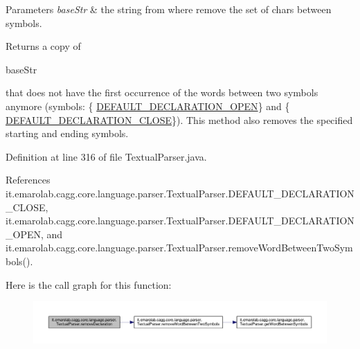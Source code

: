 \begin{DoxyParams}{Parameters}
{\em base\-Str} & the string from where remove the set of chars between symbols. \\
\hline
\end{DoxyParams}
\begin{DoxyReturn}{Returns}
a copy of
\begin{DoxyCode}
baseStr 
\end{DoxyCode}
 that does not have the first occurrence of the words between two symbols anymore (symbols\-: \{ \hyperlink{classit_1_1emarolab_1_1cagg_1_1core_1_1language_1_1parser_1_1TextualParser_aa075e6ceef45f7c212a5a7074e3c3417}{D\-E\-F\-A\-U\-L\-T\-\_\-\-D\-E\-C\-L\-A\-R\-A\-T\-I\-O\-N\-\_\-\-O\-P\-E\-N}\} and \{ \hyperlink{classit_1_1emarolab_1_1cagg_1_1core_1_1language_1_1parser_1_1TextualParser_ad3397a80478c23fe4bcd487e6ffd6c0d}{D\-E\-F\-A\-U\-L\-T\-\_\-\-D\-E\-C\-L\-A\-R\-A\-T\-I\-O\-N\-\_\-\-C\-L\-O\-S\-E}\}). This method also removes the specified starting and ending symbols. 
\end{DoxyReturn}


Definition at line 316 of file Textual\-Parser.\-java.



References it.\-emarolab.\-cagg.\-core.\-language.\-parser.\-Textual\-Parser.\-D\-E\-F\-A\-U\-L\-T\-\_\-\-D\-E\-C\-L\-A\-R\-A\-T\-I\-O\-N\-\_\-\-C\-L\-O\-S\-E, it.\-emarolab.\-cagg.\-core.\-language.\-parser.\-Textual\-Parser.\-D\-E\-F\-A\-U\-L\-T\-\_\-\-D\-E\-C\-L\-A\-R\-A\-T\-I\-O\-N\-\_\-\-O\-P\-E\-N, and it.\-emarolab.\-cagg.\-core.\-language.\-parser.\-Textual\-Parser.\-remove\-Word\-Between\-Two\-Symbols().



Here is the call graph for this function\-:\nopagebreak
\begin{figure}[H]
\begin{center}
\leavevmode
\includegraphics[width=350pt]{classit_1_1emarolab_1_1cagg_1_1core_1_1language_1_1parser_1_1TextualParser_afc9699817effc3691e85e5b2ab49e6cf_cgraph}
\end{center}
\end{figure}


